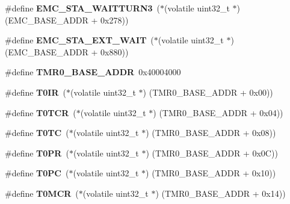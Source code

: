 \begin{DoxyCompactItemize}
\#define {\bfseries E\+M\+C\+\_\+\+S\+T\+A\+\_\+\+W\+A\+I\+T\+T\+U\+R\+N3}~($\ast$(volatile uint32\+\_\+t $\ast$) (E\+M\+C\+\_\+\+B\+A\+S\+E\+\_\+\+A\+D\+DR + 0x278))
\item 
\mbox{\label{group__lpc24xx__regs_ga7f024cfa3979cd3c4c0432e4c981fc59}} 
\#define {\bfseries E\+M\+C\+\_\+\+S\+T\+A\+\_\+\+E\+X\+T\+\_\+\+W\+A\+IT}~($\ast$(volatile uint32\+\_\+t $\ast$) (E\+M\+C\+\_\+\+B\+A\+S\+E\+\_\+\+A\+D\+DR + 0x880))
\item 
\mbox{\label{group__lpc24xx__regs_gaf7bc92a27446332c063a696f34146ba6}} 
\#define {\bfseries T\+M\+R0\+\_\+\+B\+A\+S\+E\+\_\+\+A\+D\+DR}~0x40004000
\item 
\mbox{\label{group__lpc24xx__regs_gae669c80390f9475369f2c4f48f7630b3}} 
\#define {\bfseries T0\+IR}~($\ast$(volatile uint32\+\_\+t $\ast$) (T\+M\+R0\+\_\+\+B\+A\+S\+E\+\_\+\+A\+D\+DR + 0x00))
\item 
\mbox{\label{group__lpc24xx__regs_ga0f7a4e745f989cba7121a2a089400243}} 
\#define {\bfseries T0\+T\+CR}~($\ast$(volatile uint32\+\_\+t $\ast$) (T\+M\+R0\+\_\+\+B\+A\+S\+E\+\_\+\+A\+D\+DR + 0x04))
\item 
\mbox{\label{group__lpc24xx__regs_gacc99e4d315de652060365cb4a634d071}} 
\#define {\bfseries T0\+TC}~($\ast$(volatile uint32\+\_\+t $\ast$) (T\+M\+R0\+\_\+\+B\+A\+S\+E\+\_\+\+A\+D\+DR + 0x08))
\item 
\mbox{\label{group__lpc24xx__regs_gaf0820bf2601acb2528db5ca569a67baf}} 
\#define {\bfseries T0\+PR}~($\ast$(volatile uint32\+\_\+t $\ast$) (T\+M\+R0\+\_\+\+B\+A\+S\+E\+\_\+\+A\+D\+DR + 0x0\+C))
\item 
\mbox{\label{group__lpc24xx__regs_ga5f5b19ff825c0d2d71a088a5189a0db1}} 
\#define {\bfseries T0\+PC}~($\ast$(volatile uint32\+\_\+t $\ast$) (T\+M\+R0\+\_\+\+B\+A\+S\+E\+\_\+\+A\+D\+DR + 0x10))
\item 
\mbox{\label{group__lpc24xx__regs_ga301ebbd28f97690cab064ef6ca985e01}} 
\#define {\bfseries T0\+M\+CR}~($\ast$(volatile uint32\+\_\+t $\ast$) (T\+M\+R0\+\_\+\+B\+A\+S\+E\+\_\+\+A\+D\+DR + 0x14))

\end{DoxyCompactItemize}
